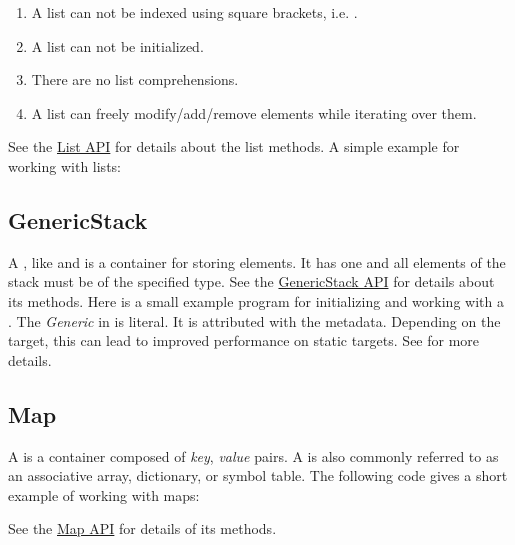 \begin{enumerate}
	\item A list can not be indexed using square brackets, i.e. \expr{[0]}.
	\item A list can not be initialized.
	\item There are no list comprehensions.
	\item A list can freely modify/add/remove elements while iterating over them.
\end{enumerate}

See the \href{http://api.haxe.org/List.html}{List API} for details about the list methods.  A simple example for working with lists:

\subsection{GenericStack}
\label{std-GenericStack}
A , like  and  is a container for storing elements.  It has one  and all elements of the stack must be of the specified type. See the \href{http://api.haxe.org/haxe/ds/GenericStack.html}{GenericStack API} for details about its methods.  Here is a small example program for initializing and working with a .
The \emph{Generic} in  is literal.  It is attributed with the  metadata.  Depending on the target, this can lead to improved performance on static targets.  See  for more details.



\subsection{Map}
\label{std-Map}

A  is a container composed of \emph{key}, \emph{value} pairs.  A  is also commonly referred to as an associative array, dictionary, or symbol table. The following code gives a short example of working with maps:


See the \href{http://api.haxe.org/Map.html}{Map API} for details of its methods.

